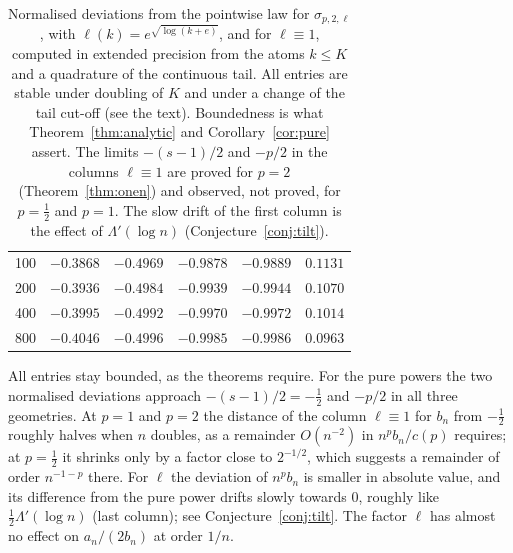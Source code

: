 \begin{table}[ht]
\begin{tabular}{rrrrrr}
 100 & $-0.3868$ & $-0.4969$ & $-0.9878$ & $-0.9889$ & $0.1131$\\
 200 & $-0.3936$ & $-0.4984$ & $-0.9939$ & $-0.9944$ & $0.1070$\\
 400 & $-0.3995$ & $-0.4992$ & $-0.9970$ & $-0.9972$ & $0.1014$\\
 800 & $-0.4046$ & $-0.4996$ & $-0.9985$ & $-0.9986$ & $0.0963$\\
\bottomrule
\end{tabular}
\caption{Normalised deviations from the pointwise law for $\sigma_{p,2,\ell}$, with $\ell(k)=e^{\sqrt{\log(k+e)}}$, and
for $\ell\equiv1$, computed in extended precision from the atoms $k\le K$ and a quadrature of the continuous tail. All
entries are stable under doubling of $K$ and under a change of the tail cut-off (see the text). Boundedness is what
Theorem~\ref{thm:analytic} and Corollary~\ref{cor:pure} assert. The limits $-(s-1)/2$ and $-p/2$ in the columns
$\ell\equiv1$ are proved for $p=2$ (Theorem~\ref{thm:onen}) and observed, not proved, for $p=\frac12$ and $p=1$. The
slow drift of the first column is the effect of $\Lambda'(\log n)$ (Conjecture~\ref{conj:tilt}).}
\label{tab:numerics}
\end{table}

All entries stay bounded, as the theorems require. For the pure powers the two normalised deviations approach
$-(s-1)/2=-\frac12$ and $-p/2$ in all three geometries. At $p=1$ and $p=2$ the distance of the column $\ell\equiv1$ for
$b_n$ from $-\frac12$ roughly halves when $n$ doubles, as a remainder $O(n^{-2})$ in $n^pb_n/c(p)$ requires; at
$p=\frac12$ it shrinks only by a factor close to $2^{-1/2}$, which suggests a remainder of order $n^{-1-p}$ there. For
$\ell$ the deviation of $n^pb_n$ is smaller in absolute value, and its difference from the pure power drifts slowly
towards $0$, roughly like $\frac12\Lambda'(\log n)$ (last column); see Conjecture~\ref{conj:tilt}. The factor $\ell$ has
almost no effect on $a_n/(2b_n)$ at order $1/n$.

